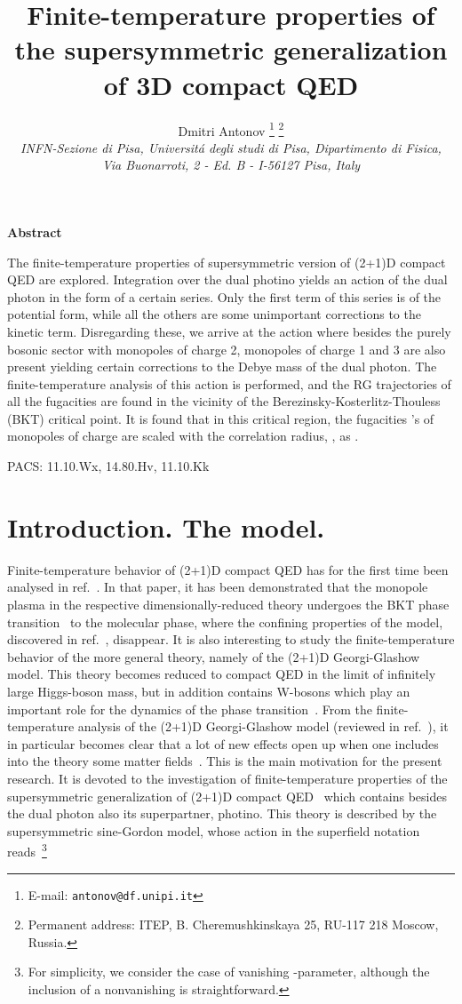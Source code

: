\documentclass[a4paper,12pt]{article}
\title{
\vspace{-3mm}
\rightline{\small IFUP-TH 2002/41}
\vspace{8mm}
\bf Finite-temperature properties of the supersymmetric generalization of
3D compact QED}
\author{
Dmitri Antonov \thanks{
E-mail: {\tt antonov@df.unipi.it}}
\thanks{Permanent address:
ITEP, B. Cheremushkinskaya 25, RU-117 218 Moscow, Russia.}\\
{\it INFN-Sezione di Pisa, Universit\'a degli studi di Pisa,
Dipartimento di Fisica,}\\
{\it Via Buonarroti, 2 - Ed. B -
I-56127 Pisa, Italy}}
\date{}
\begin{document}
\maketitle
\vspace{1mm}
\centerline{\bf {Abstract}}
\vspace{3mm}
\noindent
The finite-temperature properties of supersymmetric version of (2+1)D compact QED are explored.
Integration over the dual photino yields an action of the dual photon in the
form of a certain series. Only the first term of this series is of the potential form,
while all the others are some unimportant corrections to the kinetic term.
Disregarding these, we arrive at the action where besides the purely bosonic sector with
monopoles of charge 2, monopoles of charge 1 and 3 are also present yielding
certain corrections to the Debye mass of the dual photon. The finite-temperature analysis
of this action is performed, and the RG trajectories of all the fugacities are found
in the vicinity of the Berezinsky-Kosterlitz-Thouless (BKT) critical point.
It is found that in this critical region, the fugacities \coordHE{}'s of monopoles of charge
\coordHE{} are scaled with the correlation radius, \coordHE{}, as \coordHE{}.




\vspace{5mm}
\noindent
PACS: 11.10.Wx, 14.80.Hv, 11.10.Kk


\newpage
\section{Introduction. The model.}
Finite-temperature behavior of (2+1)D compact QED has for the first time been analysed in ref.~\cite{nk}.
In that paper, it has been demonstrated that the monopole plasma in the respective dimensionally-reduced theory
undergoes the BKT phase transition~\cite{bkt} to the molecular phase, where the confining properties of the
model, discovered in ref.~\cite{1}, disappear.
It is also interesting to study the finite-temperature behavior of the more general theory, namely of the
(2+1)D Georgi-Glashow model. This theory becomes reduced to compact QED
in the limit of infinitely large Higgs-boson mass, but in addition contains W-bosons which play an important role for the
dynamics of the phase transition~\cite{2}. From the finite-temperature analysis of the (2+1)D Georgi-Glashow model
(reviewed in ref.~\cite{revGG}), it in particular
becomes clear that a lot of new effects open up when one includes into the theory some matter fields~\cite{mat}.
This is the main motivation for the present research. It is devoted to the investigation
of finite-temperature properties of the supersymmetric generalization of (2+1)D compact QED~\cite{ahw} which
contains besides the dual photon also its superpartner, photino. This theory is described by the supersymmetric
sine-Gordon model, whose action in the superfield notation reads~\footnote{For simplicity, we consider the
case of vanishing \myHighlight{$\Theta$}\coordHE{}-parameter, although the inclusion of a nonvanishing \myHighlight{$\Theta$}\coordHE{} is straightforward.}
\end{document}
